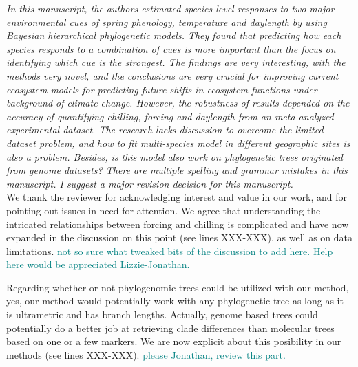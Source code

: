\documentclass[11pt]{article}
\begin{document}
\emph{In this manuscript, the authors estimated species-level responses to two major environmental cues of spring phenology, temperature and daylength by using Bayesian hierarchical phylogenetic models. They found that predicting how each species responds to a combination of cues is more important than the focus on identifying which cue is the strongest. The findings are very interesting, with the methods very novel, and the conclusions are very crucial for improving current ecosystem models for predicting future shifts in ecosystem functions under background of climate change. However, the robustness of results depended on the accuracy of quantifying chilling, forcing and daylength from an meta-analyzed experimental dataset. The research lacks discussion to overcome the limited dataset problem, and how to fit multi-species model in different geographic sites is also a problem. Besides, is this model also work on phylogenetic trees originated from genome datasets? There are multiple spelling and grammar mistakes in this manuscript. I suggest a major revision decision for this manuscript.}\\


We thank the reviewer for acknowledging interest and value in our work, and for pointing out issues in need for attention. We agree that understanding the intricated relationships between forcing and chilling is complicated and have now expanded in the discussion on this point (see lines XXX-XXX), as well as on data limitations. 
\textcolor{teal}{not so sure what tweaked bits of the discussion to add here. Help here would be appreciated Lizzie-Jonathan.} 

Regarding whether or not phylogenomic trees could be utilized with our method, yes, our method would potentially work with any phylogenetic tree as long as it is ultrametric and has branch lengths. Actually, genome based trees could potentially do a better job at retrieving clade differences than molecular trees based on one or a few markers. We are now explicit about this posibility in our methods (see lines XXX-XXX). 
\textcolor{teal}{please Jonathan, review this part.} 
\end{document}
